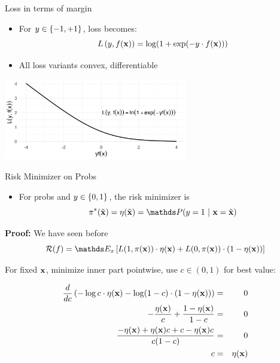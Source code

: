 \documentclass[11pt,compress,t,notes=noshow, xcolor=table]{beamer}
\begin{document}
\begin{vbframe}{Loss in terms of margin}

\begin{itemize}
\item For $y \in \{-1, +1\}$, loss becomes: 
$$
  L\left(y, f(\mathbf{x})\right) = \log(1+\exp(-y \cdot f(\mathbf{x}))) 
$$
 
\item All loss variants convex, differentiable
\end{itemize}

 \vfill

\begin{center}
\includegraphics[width = 8cm]{figure/bernoulli_margin.png}
\end{center}

\end{vbframe}


\begin{vbframe}{Risk Minimizer on Probs}

\begin{itemize}
    \item For probs and $y \in \{0, 1\}$, the risk minimizer is
$$
  \piastxtil = \eta(\xtil) = \P(y = 1 ~|~ \xv = \xtil) 
$$
\end{itemize}


\textbf{Proof:} We have seen before
$$
  \riskf = \E_x \left[L(1, \pix) \cdot \eta(\xv) + L(0, \pix) \cdot (1 - \eta(\xv)) \right]
$$

For fixed $\mathbf{x}$, minimize inner part pointwise, use $c\in(0,1)$ for best value:

\begin{footnotesize}
\begin{eqnarray*}
  \frac{d }{d c} \left(- \log c  \cdot \eta(\mathbf{x})- \log (1 - c) \cdot (1 - \eta(\mathbf{x}))\right) &=& 0 \\
  - \frac{\eta(\mathbf{x})}{c} + \frac{1 - \eta(\mathbf{x})}{1 - c} &=& 0 \\
  \frac{- \eta(\mathbf{x}) + \eta(\mathbf{x}) c + c - \eta(\mathbf{x}) c}{c (1 - c)} &=& 0 \\
  c &=& \eta(\mathbf{x})
\end{eqnarray*}
\end{footnotesize}

\end{vbframe}
\end{document}

